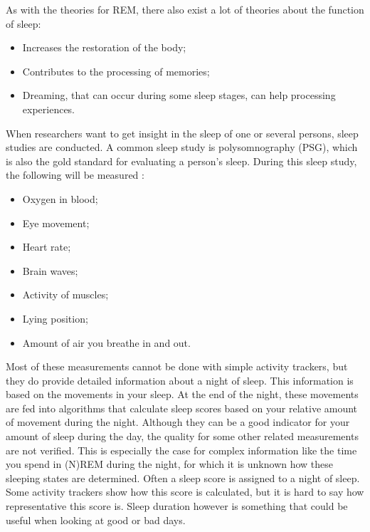 As with the theories for REM, there also exist a lot of theories about the function of sleep:
%
\begin{itemize}
	\item Increases the restoration of the body;
	\item Contributes to the processing of memories;
	\item Dreaming, that can occur during some sleep stages, can help processing experiences.
\end{itemize}
%
When researchers want to get insight in the sleep of one or several persons, sleep studies are conducted. 
A common sleep study is polysomnography (PSG), which is also the gold standard for evaluating a person's sleep.
During this sleep study, the following will be measured \cite{polysomnography}:
%
\begin{itemize}
	\item Oxygen in blood;
	\item Eye movement;
	\item Heart rate;
	\item Brain waves;
	\item Activity of muscles;
	\item Lying position;
	\item Amount of air you breathe in and out.
\end{itemize}
%
Most of these measurements cannot be done with simple activity trackers, but they do provide detailed information about a night of sleep.
This information is based on the movements in your sleep.
At the end of the night, these movements are fed into algorithms that calculate sleep scores based on your relative amount of movement during the night. 
Although they can be a good indicator for your amount of sleep during the day, the quality for some other related measurements are not verified.
This is especially the case for complex information like the time you spend in (N)REM during the night, for which it is unknown how these sleeping states are determined.
Often a sleep score is assigned to a night of sleep.
Some activity trackers show how this score is calculated, but it is hard to say how representative this score is. 
Sleep duration however is something that could be useful when looking at good or bad days.

